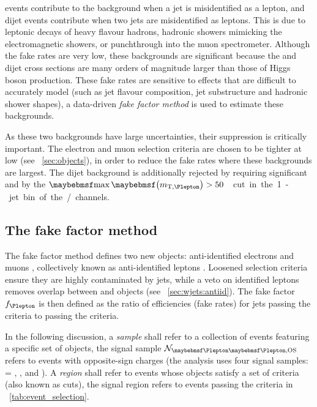 
\Wjets events contribute to the background when a jet is misidentified as a lepton, and 
dijet events contribute when two jets are misidentified as leptons. This is due to leptonic 
decays of heavy flavour hadrons, hadronic showers mimicking the electromagnetic showers, or 
punchthrough into the muon spectrometer. Although the fake rates are very low, these 
backgrounds are significant because the \Wjets and dijet cross sections are many orders of 
magnitude larger than those of Higgs boson production. These fake rates are sensitive to 
effects that are difficult to accurately model (such as jet flavour composition, jet 
substructure and hadronic shower shapes), a data-driven \textit{fake factor method} is used 
to estimate these backgrounds.

As these two backgrounds have large uncertainties, their suppression is critically 
important. The electron and muon selection criteria are chosen to be tighter at low \pt 
(see \Section~\ref{sec:objects}), in order to reduce the fake rates where these backgrounds 
are largest. The dijet background is additionally rejected by requiring significant \met 
and by the \unit{$\maxmtw > 50$}{\GeV} cut in the 1-jet bin of the \emch/\mech channels.



\subsection{The fake factor method}
\label{sec:wjets:fakefactor_method}

The fake factor method defines two new objects: anti-identified electrons \antiid{\Pe} and 
muons \antiid{\Pmu}, collectively known as anti-identified leptons \antiid{\Plepton}. 
Loosened selection criteria ensure they are highly contaminated by jets, while a veto on 
identified leptons \id{\Plepton} removes overlap between \id{\Plepton} and \antiid{\Plepton}
objects (see \Section~\ref{sec:wjets:antiid}). The fake factor $f_{\Plepton}$ is then 
defined as the ratio of efficiencies (\ie fake rates) for jets passing the \id{\Plepton} 
criteria to passing the \antiid{\Plepton} criteria.

In the following discussion, a \textit{sample} shall refer to a collection of events 
featuring a specific set of objects, \eg the signal sample 
$\mathcal{N}_{\id{\Plepton}\id{\Plepton}\text{,OS}}$ refers to \id{\Plepton}\id{\Plepton} 
events with opposite-sign charges (the \HWW analysis uses four signal samples: 
\id{\Plepton}\id{\Plepton} = \id{\Pe}\id{\Pe}, \id{\Pmu}\id{\Pmu}, \id{\Pe}\id{\Pmu} and 
\id{\Pmu}\id{\Pe}). A \textit{region} shall refer to events whose objects satisfy a set 
of criteria (also known as cuts), \eg the signal region refers to events passing the 
criteria in \Table~\ref{tab:event_selection}.

